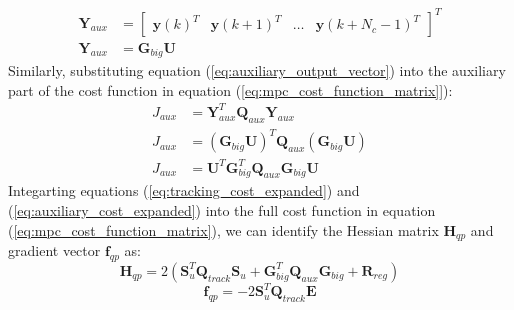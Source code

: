 \begin{equation}
    \begin{split}
        \mathbf{Y}_{aux} &= \begin{bmatrix} \mathbf{y}(k)^T & \mathbf{y}(k+1)^T & \dots & \mathbf{y}(k+N_c-1)^T \end{bmatrix}^T \\
        \mathbf{Y}_{aux} &= \mathbf{G}_{big} \mathbf{U}
    \end{split}
    \label{eq:auxiliary_output_vector}
\end{equation}
Similarly, substituting equation (\ref{eq:auxiliary_output_vector}) into the auxiliary part of the cost function in equation
(\ref{eq:mpc_cost_function_matrix}]):
\begin{equation}
    \begin{split}
        J_{aux} &= \mathbf{Y}_{aux}^T \mathbf{Q}_{aux} \mathbf{Y}_{aux} \\
        J_{aux} &= (\mathbf{G}_{big} \mathbf{U})^T \mathbf{Q}_{aux} (\mathbf{G}_{big} \mathbf{U}) \\
        J_{aux} &= \mathbf{U}^T \mathbf{G}_{big}^T \mathbf{Q}_{aux} \mathbf{G}_{big} \mathbf{U}
    \end{split}
    \label{eq:auxiliary_cost_expanded}
\end{equation}
Integarting equations (\ref{eq:tracking_cost_expanded}) and (\ref{eq:auxiliary_cost_expanded}) into the full cost function in equation
(\ref{eq:mpc_cost_function_matrix}), we can identify the Hessian matrix $\mathbf{H}_{qp}$ and gradient vector $\mathbf{f}_{qp}$ as:
\begin{equation}
    \mathbf{H}_{qp} = 2 \left( \mathbf{S}_u^T \mathbf{Q}_{track} \mathbf{S}_u + \mathbf{G}_{big}^T \mathbf{Q}_{aux} \mathbf{G}_{big} + \mathbf{R}_{reg} \right)
    \label{eq:qp_hessian_matrix}
\end{equation}
\begin{equation}
    \mathbf{f}_{qp} = -2 \mathbf{S}_u^T \mathbf{Q}_{track} \mathbf{E}
    \label{eq:qp_gradient_vector}
\end{equation}
